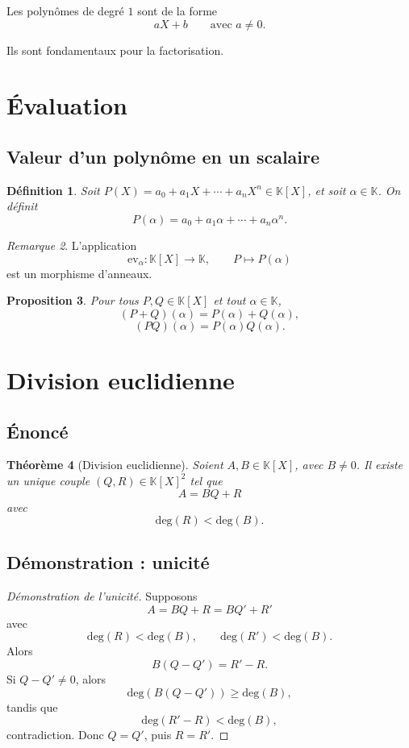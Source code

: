 \documentclass[11pt,a4paper]{article}
\newtheorem{definition}{Définition}[section]
\newtheorem{theoreme}[definition]{Théorème}
\newtheorem{proposition}[definition]{Proposition}
\theoremstyle{remark}
\newtheorem{remarque}[definition]{Remarque}
\newcommand{\K}{\mathbb{K}}
\newcommand{\degP}{\mathrm{deg}}
\begin{document}
Les polynômes de degré \(1\) sont de la forme
\[
aX+b
\qquad \text{avec } a\neq 0.
\]

Ils sont fondamentaux pour la factorisation.

\section{Évaluation}

\subsection{Valeur d’un polynôme en un scalaire}

\begin{definition}
Soit \(P(X)=a_0+a_1X+\cdots+a_nX^n\in\K[X]\), et soit \(\alpha\in\K\).  
On définit
\[
P(\alpha)=a_0+a_1\alpha+\cdots+a_n\alpha^n.
\]
\end{definition}

\begin{remarque}
L’application
\[
\mathrm{ev}_\alpha:\K[X]\to\K,\qquad P\mapsto P(\alpha)
\]
est un morphisme d’anneaux.
\end{remarque}

\begin{proposition}
Pour tous \(P,Q\in\K[X]\) et tout \(\alpha\in\K\),
\[
(P+Q)(\alpha)=P(\alpha)+Q(\alpha),
\]
\[
(PQ)(\alpha)=P(\alpha)Q(\alpha).
\]
\end{proposition}

\section{Division euclidienne}

\subsection{Énoncé}

\begin{theoreme}[Division euclidienne]
Soient \(A,B\in\K[X]\), avec \(B\neq 0\).  
Il existe un unique couple \((Q,R)\in\K[X]^2\) tel que
\[
A=BQ+R
\]
avec
\[
\degP(R)<\degP(B).
\]
\end{theoreme}

\subsection{Démonstration : unicité}

\begin{proof}[Démonstration de l’unicité]
Supposons
\[
A=BQ+R=BQ'+R'
\]
avec
\[
\degP(R)<\degP(B),
\qquad
\degP(R')<\degP(B).
\]
Alors
\[
B(Q-Q')=R'-R.
\]
Si \(Q-Q'\neq 0\), alors
\[
\degP(B(Q-Q'))\ge \degP(B),
\]
tandis que
\[
\degP(R'-R)<\degP(B),
\]
contradiction. Donc \(Q=Q'\), puis \(R=R'\).
\end{proof}
\end{document}
